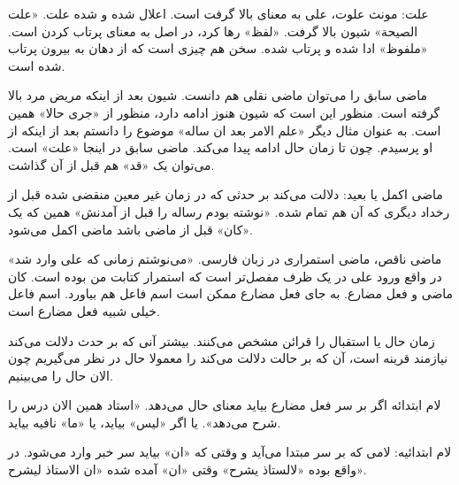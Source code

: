 \documentclass{article}
\begin{document}
\begin{addpage}{7}
  \vspace*{1cm}
  \begin{note}
    علت: مونث علوت، علی به معنای بالا گرفت است. اعلال شده و شده علت. «علت الصیحة» شیون بالا گرفت. «لفظ» رها کرد، در اصل به معنای پرتاب کردن است.
    «ملفوظ» ادا شده و پرتاب شده. سخن هم چیزی است که از دهان به بیرون پرتاب شده است.
  \end{note}
  \begin{note}
    ماضی سابق را می‌توان ماضی نقلی هم دانست. شیون بعد از اینکه مریض مرد
    بالا گرفته است. منظور این است که شیون هنوز ادامه دارد، منظور از
    «جری حالا» همین است.  به عنوان مثال دیگر «علم الامر بعد ان ساله»
    موضوع را دانستم بعد از اینکه از او پرسیدم. چون تا زمان حال ادامه
    پیدا می‌کند. ماضی سابق در اینجا «علت» است. می‌توان یک «قد» هم قبل از
    آن گذاشت.
  \end{note}
  \begin{note}
    ماضی اکمل یا بعید: دلالت می‌کند بر حدثی که در زمان غیر معین منقضی شده قبل از رخداد دیگری که آن هم تمام شده. «نوشته بودم رساله را قبل از آمدنش»
    همین که یک «کان» قبل از ماضی باشد ماضی اکمل می‌شود.
  \end{note}
  \begin{note}
    ماضی ناقص، ماضی استمراری در زبان فارسی. «می‌نوشتم زمانی که علی وارد شد» در واقع ورود علی در یک ظرف مفصل‌تر است که استمرار کتابت من بوده است.
    کان ماضی و فعل مضارع. به جای فعل مضارع ممکن است اسم فاعل هم بیاورد. اسم فاعل خیلی شبیه فعل مضارع است.
  \end{note}
  \begin{note}
    زمان حال یا استقبال را قرائن مشخص می‌کنند. بیشتر آنی که بر حدث
    دلالت می‌کند نیازمند قرینه است، آن که بر حالت دلالت می‌کند را معمولا
    حال در نظر می‌گیریم چون الان حال را می‌بینیم.
  \end{note}
  \begin{note}

    لام ابتدائه اگر بر سر فعل مضارع بیاید معنای حال می‌دهد. «استاد همین الان درس را شرح می‌دهد». یا اگر «لیس» بیاید، یا «ما» نافیه بیاید.

    لام ابتدائیه: لامی که بر سر مبتدا می‌آید و وقتی که «ان» بیاید سر خبر وارد می‌شود. در واقع بوده «لالستاذ یشرح» وقتی «ان» آمده شده «ان الاستاذ لیشرح».

  \end{note}
  \begin{note}

  \end{note}

\end{addpage}
\end{document}
